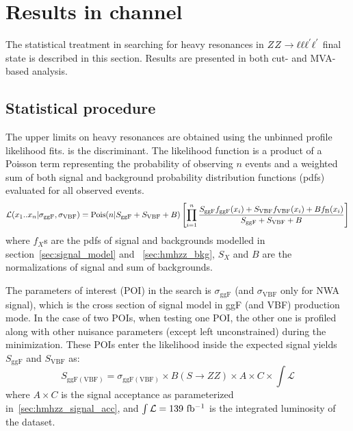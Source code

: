 \section{Results in \llll channel}
\label{sec:hmhzz_result_4l}

The statistical treatment in searching for heavy resonances in $ZZ \rightarrow \ell\ell\ell^{'}\ell^{'}$ final state is described in this section.
Results are presented in both cut- and MVA- based analysis.

\subsection{Statistical procedure}

The upper limits on heavy resonances are obtained using the unbinned profile likelihood fits.
\mfl is the discriminant.
The likelihood function is a product of a Poisson term representing the probability of observing $n$ events 
and a weighted sum of both signal and background probability distribution functions (pdfs) evaluated for all observed events.
\begingroup
\small
\begin{equation}
  {\cal L } (x_{1}..x_{n}| \sigma_{\textrm{ggF}}, \sigma_{\textrm{VBF}}) = \textrm{Pois}(n|S_{\textrm{ggF}} + S_{\textrm{VBF}} + B)  \left[ \prod\limits^{n}_{i=1}
  \frac{S_{\textrm{ggF}} f_{\textrm{ggF}}(x_{i}) + S_{\textrm{VBF}} f_{\textrm{VBF}}(x_{i}) + B f_{\textrm{B}}(x_{i})}{S_{\textrm{ggF}} + S_{\textrm{VBF}} + B}
  \right]
\end{equation}
\endgroup
where $f_X$s are the pdfs of signal and backgrounds modelled in section~\ref{sec:signal_model} and ~\ref{sec:hmhzz_bkg}, 
$S_X$ and $B$ are the normalizations of signal and sum of backgrounds.

The parameters of interest (POI) in the search is $\sigma_{\textrm{ggF}}$ (and $\sigma_{\textrm{VBF}}$ only for NWA signal), which is the cross section of signal model in ggF (and VBF) production mode.
In the case of two POIs, when testing one POI, the other one is profiled along with other nuisance parameters (except left unconstrained) during the minimization. 
These POIs enter the likelihood inside the expected signal yields $S_{\mathrm{ggF}}$ and $S_{\mathrm{VBF}}$ as:
\begingroup
\small
\begin{equation}
S_{\mathrm{ggF(VBF)}} = \sigma_{\mathrm{ggF(VBF)}} \times B(S\rightarrow ZZ) \times A \times C \times \int\mathcal{L}
\end{equation}
\endgroup
where $A\times C$ is the signal acceptance as parameterized in~\ref{sec:hmhzz_signal_acc}, and $\int\mathcal{L} = 139~\mbox{fb\(^{-1}\)} $ is the integrated luminosity of the dataset.

